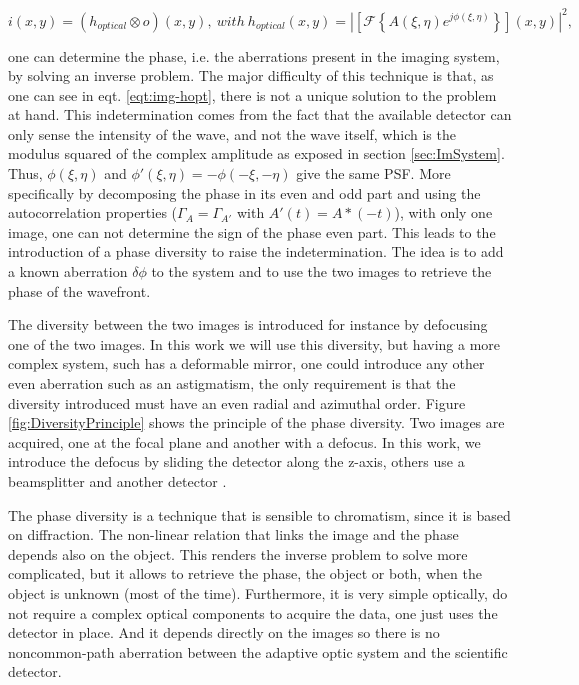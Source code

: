 \begin{equation}
i(x,y) = (h_{optical}\otimes o)(x,y), \ with \ h_{optical}(x,y) = |\left[\mathcal{F}\left\lbrace A(\xi,\eta)e^{j\phi(\xi,\eta)} \right\rbrace\right](x,y)|^2,
\label{eqt:img-hopt}
\end{equation}

one can determine the phase, i.e. the aberrations present in the imaging system, by solving an inverse problem. The major difficulty of this technique is that, as one can see in eqt. \eqref{eqt:img-hopt}, there is not a unique solution to the problem at hand. This indetermination comes from the fact that the available detector can only sense the intensity of the wave, and not the wave itself, which is the modulus squared of the complex amplitude as exposed in section \ref{sec:ImSystem}. Thus, $\phi(\xi,\eta)$ and $\phi'(\xi,\eta)=-\phi(-\xi,-\eta)$ give the same PSF.
More specifically by decomposing the phase in its even and odd part and using the autocorrelation properties ($\Gamma_A = \Gamma_{A'}$ with $A'(t) = A*(-t)$), with only one image, one can not determine the sign of the phase even part. This leads to the introduction of a phase diversity to raise the indetermination. The idea is to add a known aberration $\delta\phi$ to the system and to use the two images to retrieve the phase of the wavefront.

The diversity between the two images is introduced for instance by defocusing one of the two images. In this work we will use this diversity, but having a more complex system, such has a deformable mirror, one could introduce any other even aberration such as an astigmatism, the only requirement is that the diversity introduced must have an even radial and azimuthal order. Figure \ref{fig:DiversityPrinciple} shows the principle of the phase diversity. Two images are acquired, one at the focal plane and another with a defocus. In this work, we introduce the defocus by sliding the detector along the z-axis, others use a beamsplitter and another detector \citep{mugnier_2006}.

The phase diversity is a technique that is sensible to chromatism, since it is based on diffraction. The non-linear relation that links the image and the phase depends also on the object. This renders the inverse problem to solve more complicated, but it allows to retrieve the phase, the object or both, when the object is unknown (most of the time). Furthermore, it is very simple optically, do not require a complex optical components to acquire the data, one just uses the detector in place. And it depends directly on the images so there is no noncommon-path aberration between the adaptive optic system and the scientific detector.

